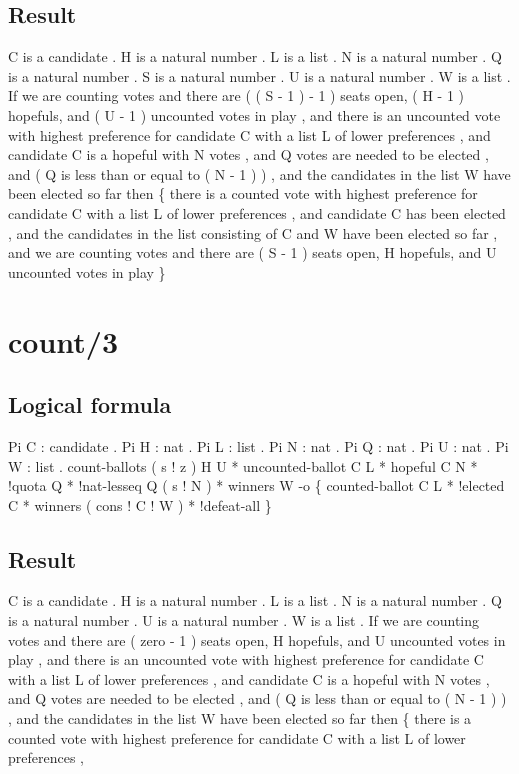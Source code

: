 \subsection{Result}
\begin{texto2}
	C is a candidate . H is a natural number . L is a list . N is a natural number . Q is a natural number . S is a natural number . U is a natural number . W is a list . If we are counting votes and there are ( ( S - 1 ) - 1 ) seats open, ( H - 1 ) hopefuls, and ( U - 1 ) uncounted votes in play , and there is an uncounted vote with highest preference for candidate C with a list L of lower preferences , and candidate C is a hopeful with N votes , and Q votes are needed to be elected , and ( Q is less than or equal to ( N - 1 ) ) , and the candidates in the list W have been elected so far then \{ there is a counted vote with highest preference for candidate C with a list L of lower preferences , and candidate C has been elected , and the candidates in the list consisting of C and W have been elected so far , and we are counting votes and there are ( S - 1 ) seats open, H hopefuls, and U uncounted votes in play \}
\end{texto2}

\section{count/3}
\subsection{Logical formula}
\begin{texto2}
	Pi C : candidate . Pi H : nat . Pi L : list . Pi N : nat . Pi Q : nat . Pi U : nat . Pi W : list . count-ballots ( s ! z ) H U * uncounted-ballot C L * hopeful C N * !quota Q * !nat-lesseq Q ( s ! N ) * winners W -o \{ counted-ballot C L * !elected C * winners ( cons ! C ! W ) * !defeat-all \}
\end{texto2}

\subsection{Result}
\begin{texto2}
	C is a candidate . H is a natural number . L is a list . N is a natural number . Q is a natural number . U is a natural number . W is a list . If we are counting votes and there are ( zero - 1 ) seats open, H hopefuls, and U uncounted votes in play , and there is an uncounted vote with highest preference for candidate C with a list L of lower preferences , and candidate C is a hopeful with N votes , and Q votes are needed to be elected , and ( Q is less than or equal to ( N - 1 ) ) , and the candidates in the list W have been elected so far then \{ there is a counted vote with highest preference for candidate C with a list L of lower preferences , 
\end{texto2}

